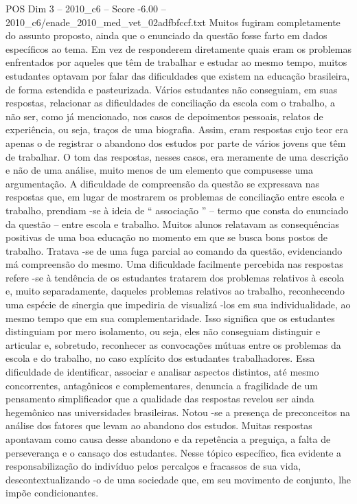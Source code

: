 \begin{textsample}{POS Dim 3 – 2010\_c6 – Score -6.00 – 2010\_c6/enade\_2010\_med\_vet\_02adfbfccf.txt}
Muitos fugiram completamente do assunto proposto, ainda que o enunciado da questão fosse farto em dados específicos ao tema.
Em vez de responderem diretamente quais eram os problemas enfrentados por aqueles que têm de trabalhar e estudar ao mesmo tempo, muitos estudantes optavam por falar das dificuldades que existem na educação brasileira, de forma estendida e pasteurizada.
Vários estudantes não conseguiam, em suas respostas, relacionar as dificuldades de conciliação da escola com o trabalho, a não ser, como já mencionado, nos casos de depoimentos pessoais, relatos de experiência, ou seja, traços de uma biografia.
Assim, eram respostas cujo teor era apenas o de registrar o abandono dos estudos por parte de vários jovens que têm de trabalhar.
O tom das respostas, nesses casos, era meramente de uma descrição e não de uma análise, muito menos de um elemento que compusesse uma argumentação.
A dificuldade de compreensão da questão se expressava nas respostas que, em lugar de mostrarem os problemas de conciliação entre escola e trabalho, prendiam -se à ideia de “ associação ” – termo que consta do enunciado da questão – entre escola e trabalho.
Muitos alunos relatavam as consequências positivas de uma boa educação no momento em que se busca bons postos de trabalho.
Tratava -se de uma fuga parcial ao comando da questão, evidenciando má compreensão do mesmo.
Uma dificuldade facilmente percebida nas respostas refere -se à tendência de os estudantes tratarem dos problemas relativos à escola e, muito separadamente, daqueles problemas relativos ao trabalho, reconhecendo uma espécie de sinergia que impediria de visualizá -los em sua individualidade, ao mesmo tempo que em sua complementaridade.
Isso significa que os estudantes distinguiam por mero isolamento, ou seja, eles não conseguiam distinguir e articular e, sobretudo, reconhecer as convocações mútuas entre os problemas da escola e do trabalho, no caso explícito dos estudantes trabalhadores.
Essa dificuldade de identificar, associar e analisar aspectos distintos, até mesmo concorrentes, antagônicos e complementares, denuncia a fragilidade de um pensamento simplificador que a qualidade das respostas revelou ser ainda hegemônico nas universidades brasileiras.
Notou -se a presença de preconceitos na análise dos fatores que levam ao abandono dos estudos.
Muitas respostas apontavam como causa desse abandono e da repetência a preguiça, a falta de perseverança e o cansaço dos estudantes.
Nesse tópico específico, fica evidente a responsabilização do indivíduo pelos percalços e fracassos de sua vida, descontextualizando -o de uma sociedade que, em seu movimento de conjunto, lhe impõe condicionantes.

\end{textsample}
